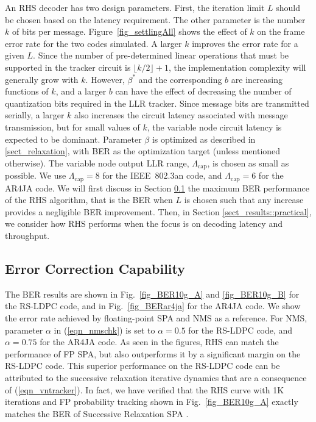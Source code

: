 \documentclass[12pt,journal,twoside,draftcls,onecolumn]{IEEEtran}
\begin{document}
An RHS decoder has two design parameters. First, the iteration limit $L$ should be chosen based on the latency requirement. The other parameter is the number $k$ of bits per message. Figure~\ref{fig_settlingAll} shows the effect of $k$ on the frame error rate for the two codes simulated. A larger $k$ improves the error rate for a given $L$. Since the number of pre-determined linear operations that must be supported in the tracker circuit is $\lfloor k/2 \rfloor + 1$, the implementation complexity will generally grow with $k$. 
However, $\beta^{*}$ and the corresponding $b$ are increasing functions of $k$, and a larger $b$ can have the effect of decreasing the number of quantization bits required in the LLR tracker.
Since message bits are transmitted serially, a larger $k$ also increases the circuit latency associated with message transmission, but for small values of $k$, the variable node circuit latency is expected to be dominant.
Parameter $\beta$ is optimized as described in \ref{sect_relaxation}, with BER as the optimization target (unless mentioned otherwise). The variable node output LLR range, $\Lambda_\mathrm{cap}$, is chosen as small as possible. We use $\Lambda_\mathrm{cap}=8$ for the IEEE~802.3an code, and $\Lambda_\mathrm{cap}=6$ for the AR4JA code. 
We will first discuss in Section \ref{sect_results::maxBER} the maximum BER performance of the RHS algorithm, that is the BER when $L$ is chosen such that any increase provides a negligible BER improvement. Then, in Section \ref{sect_results::practical}, we consider how RHS performs when the focus is on decoding latency and throughput.

\subsection{Error Correction Capability}
\label{sect_results::maxBER}

The BER results are shown in Fig.~\ref{fig_BER10g_A} and \ref{fig_BER10g_B} for the RS-LDPC code, and in Fig.~\ref{fig_BERar4ja} for the AR4JA code. We show the error rate achieved by floating-point SPA and NMS as a reference. For NMS, parameter $\alpha$ in (\ref{eqn_nmschk}) is set to $\alpha=0.5$ for the RS-LDPC code, and $\alpha=0.75$ for the AR4JA code. 
As seen in the figures, RHS can match the performance of FP SPA, but also outperforms it by a significant margin on the RS-LDPC code. 
This superior performance on the RS-LDPC code can be attributed to the successive relaxation iterative dynamics that are a consequence of (\ref{eqn_vntracker}). In fact, we have verified that the RHS curve with 1K iterations and FP probability tracking shown in Fig.~\ref{fig_BER10g_A} exactly matches the BER of Successive Relaxation SPA \cite{hemati:2006a}.
\end{document}
